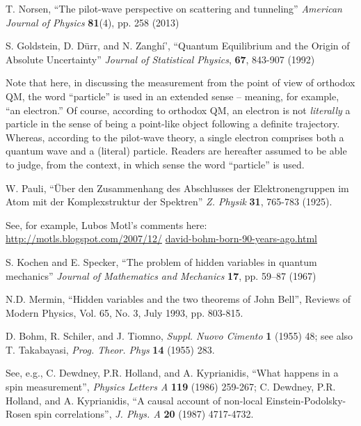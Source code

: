 \documentclass[aps,prc,onecolumn,letterpaper,floatfix,12pt]{revtex4}
\begin{document}
\raggedright
\begin{thebibliography}{99}

 T. Norsen, ``The pilot-wave perspective on scattering
  and tunneling'' \emph{American Journal of Physics} {\bf{81}}(4),
  pp. 258 (2013)

S. Goldstein, D. D\"urr, and N. Zangh{\'i'}, ``Quantum Equilibrium and the
Origin of Absolute Uncertainty'' \emph{Journal of Statistical
  Physics}, {\bf{67}}, 843-907 (1992)

Note that here, in discussing the measurement from the point of view
of orthodox QM, the word ``particle'' is used in an extended sense --
meaning, for example, ``an electron.''  Of course, according to
orthodox QM, an electron is not \emph{literally} a particle in the
sense of being a point-like object following a definite trajectory.
Whereas, according to the pilot-wave theory, a single electron
comprises both a quantum wave and a (literal) particle.  Readers are
hereafter assumed to be able to judge, from the context, in which sense the word
``particle'' is used.  


W. Pauli, ``\"Uber den Zusammenhang des Abschlusses der
Elektronengruppen im Atom mit der Komplexstruktur der Spektren'' \emph{Z. Physik} {\bf{31}}, 765-783 (1925).

See, for example, Lubos Motl's comments here:
\url{http://motls.blogspot.com/2007/12/}
\url{david-bohm-born-90-years-ago.html}

S. Kochen and E. Specker, ``The problem of hidden variables in quantum
mechanics'' \emph{Journal of Mathematics and Mechanics} {\bf{17}},
pp. 59–87 (1967)  
 

 N.D. Mermin, ``Hidden variables and the two theorems
  of John Bell'', Reviews of Modern Physics, Vol. 65, No. 3, July
  1993, pp. 803-815.



D. Bohm, R. Schiler, and J. Tiomno, \emph{Suppl. Nuovo Cimento}
{\bf{1}} (1955) 48; see also T. Takabayasi, \emph{Prog. Theor. Phys}
{\bf{14}} (1955) 283. 

See, e.g., C. Dewdney, P.R. Holland, and A. Kyprianidis, ``What happens in a spin
measurement'', \emph{Physics Letters A} {\bf{119}} (1986) 259-267;
C. Dewdney, P.R. Holland, and A. Kyprianidis, ``A causal account of
non-local Einstein-Podolsky-Rosen spin correlations'',
\emph{J. Phys. A} {\bf{20}} (1987) 4717-4732. 



\end{thebibliography}
\end{document}
